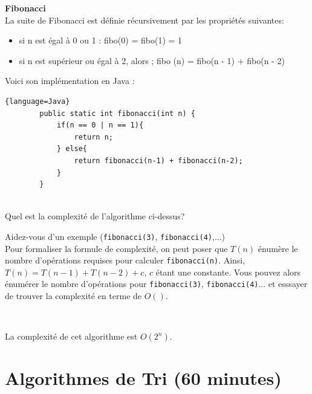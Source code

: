\begin{Exercice} [10 minutes] \textbf{Fibonacci}\\
La suite de Fibonacci est définie récursivement par les propriétés suivantes:
\begin{itemize}
    \item si n est égal à 0 ou 1 : fibo(0) = fibo(1) = 1
    \item si n est supérieur ou égal à 2, alors ; fibo (n) = fibo(n - 1) + fibo(n - 2)
\end{itemize}

Voici son implémentation en Java :

\begin{lstlisting}{language=Java}
        public static int fibonacci(int n) {
            if(n == 0 | n == 1){
                return n;
            } else{
                return fibonacci(n-1) + fibonacci(n-2);
            }
        }
        
\end{lstlisting}

Quel est la complexité de l'algorithme ci-dessus?

\begin{conseil}
Aidez-vous d'un exemple (\lstinline{fibonacci(3)}, \lstinline{fibonacci(4)},...) \\
Pour formaliser la formule de complexité, on peut poser que $T(n)$ énumère le nombre d'opérations requises pour calculer \lstinline{fibonacci(n)}. Ainsi, $T(n) = T(n-1) + T(n-2) + c$, $c$ étant une constante. Vous pouvez alors énumérer le nombre d'opérations pour \lstinline{fibonacci(3)}, \lstinline{fibonacci(4)}... et esssayer de trouver la complexité en terme de $O()$.
\end{conseil}
\ \\

\begin{solution}
    La complexité de cet algorithme est $O(2^n)$.
\end{solution}
\end{Exercice}

\section{Algorithmes de Tri (60 minutes)}

